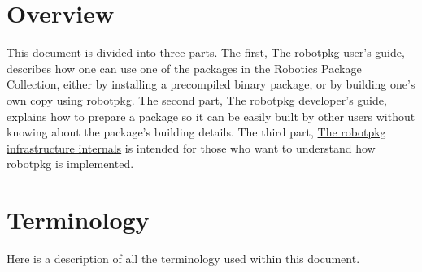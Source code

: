 \section{Overview} %

This     document  is     divided  into      three      parts.  The      first,
\hyperref[chapter:user]{The robotpkg user's guide}, describes  how one can use one
of  the packages in  the Robotics  Package  Collection, either by  installing a
precompiled binary package, or by building one's  own copy using robotpkg.  The
second part,   \hyperref[chapter:developer]{The       robotpkg developer's guide},
explains  how to prepare a package  so  it can be  easily  built by other users
without  knowing  about the   package's  building  details.  The   third  part,
\hyperref[chapter:internal]{The robotpkg infrastructure internals} is intended for
those who want to understand how robotpkg is implemented.


\section{Terminology} %

Here is a description of all the terminology used within this document.

